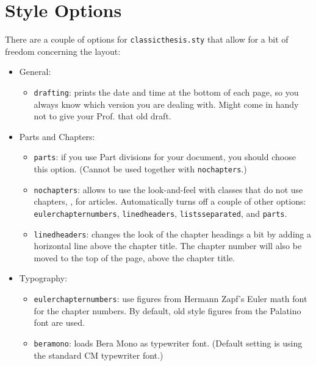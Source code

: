 \clearpage
\section{Style Options}\label{sec:options}
There are a couple of options for \texttt{classicthesis.sty} that
allow for a bit of freedom concerning the layout:
\begin{itemize}
    \item General:
        \begin{itemize}
            \item\texttt{drafting}: prints the date and time at the bottom of
    each page, so you always know which version you are dealing with.
    Might come in handy not to give your Prof. that old draft.
        \end{itemize}
    
    \item Parts and Chapters:
        \begin{itemize}
            \item\texttt{parts}: if you use Part divisions for your document,
    you should choose this option. (Cannot be used together with 
    \texttt{nochapters}.)
    
            \item\texttt{nochapters}: allows to use the look-and-feel with 
    classes that do not use chapters, \eg, for articles. Automatically
    turns off a couple of other options: \texttt{eulerchapternumbers}, 
    \texttt{linedheaders}, \texttt{listsseparated}, and \texttt{parts}. 
    
        \item\texttt{linedheaders}: changes the look of the chapter
        headings a bit by adding a horizontal line above the chapter
        title. The chapter number will also be moved to the top of the
        page, above the chapter title.
    
        \end{itemize}

  \item Typography:
        \begin{itemize}
            \item\texttt{eulerchapternumbers}: use figures from Hermann Zapf's
            Euler math font for the chapter numbers. By default, old style
            figures from the Palatino font are used.
    
            \item\texttt{beramono}: loads Bera Mono as typewriter font. 
            (Default setting is using the standard CM typewriter font.)
            

\end{itemize}
\end{itemize}

